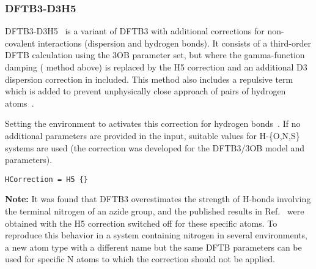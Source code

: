 \subsubsection{DFTB3-D3H5}

DFTB3-D3H5~\cite{rezac-jctc-13-2017} is a variant of DFTB3 with additional
corrections for non-covalent interactions (dispersion and hydrogen bonds).  It
consists of a third-order DFTB calculation using the 3OB parameter set, but
where the gamma-function damping ( method above) is replaced by the
H5 correction and an additional D3 dispersion correction in included. This
method also includes a repulsive term which is added to prevent unphysically
close approach of pairs of hydrogen atoms~\cite{rezac-jctc-8-2012}.

Setting the  environment to  activates this
correction for hydrogen bonds~\cite{rezac-jctc-13-2017}. If no additional
parameters are provided in the input, suitable values for H-\{O,N,S\} systems
are used (the correction was developed for the DFTB3/3OB model and parameters).
\begin{verbatim}
HCorrection = H5 {}
\end{verbatim}

\textbf{Note:} It was found that DFTB3 overestimates the strength of H-bonds
involving the terminal nitrogen of an azide group, and the published results in
Ref.~\cite{rezac-jctc-13-2017} were obtained with the H5 correction switched off
for these specific atoms. To reproduce this behavior in a system containing
nitrogen in several environments, a new atom type with a different name but the
same DFTB parameters can be used for specific N atoms to which the correction
should not be applied.


